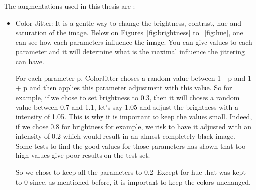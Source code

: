 The augmentations used in this thesis are :
\begin{itemize}
    \item Color Jitter: It is a gentle way to change the brightness, contrast, hue and saturation of the image. Below on Figures~\ref{fig:brightness} to ~\ref{fig:hue}, one can see how each parameters influence the image. You can give values to each parameter and it will determine what is the maximal influence the jittering can have. 
   
    For each parameter p, ColorJitter choses a random value between 1 - p and 1 + p and then applies this parameter adjustment with this value. So for example, if we chose to set brightness to 0.3, then it will choses a random value between 0.7 and 1.1, let's say 1.05 and adjust the brightness with a intensity of 1.05. This is why it is important to keep the values small. Indeed, if we chose 0.8 for brightness for example, we risk to have it adjusted with an intensity of 0.2 which would result in an almost completely black image. Some tests to find the good values for those parameters has shown that too high values give poor results on the test set. 
    
    So we chose to keep all the parameters to 0.2. Except for hue that was kept to 0 since, as mentioned before, it is important to keep the colors unchanged.


\end{itemize}
